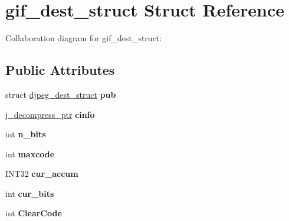 \hypertarget{structgif__dest__struct}{\section{gif\+\_\+dest\+\_\+struct Struct Reference}
\label{structgif__dest__struct}
}


Collaboration diagram for gif\+\_\+dest\+\_\+struct\+:
\subsection*{Public Attributes}
\begin{DoxyCompactItemize}
\item 
\hypertarget{structgif__dest__struct_a327fae4bb7216f81ba991b75424b9ff6}{struct \hyperlink{structdjpeg__dest__struct}{djpeg\+\_\+dest\+\_\+struct} {\bfseries pub}}\label{structgif__dest__struct_a327fae4bb7216f81ba991b75424b9ff6}

\item 
\hypertarget{structgif__dest__struct_a8b650480091b16e75d6e47a87872eb6f}{\hyperlink{structjpeg__decompress__struct}{j\+\_\+decompress\+\_\+ptr} {\bfseries cinfo}}\label{structgif__dest__struct_a8b650480091b16e75d6e47a87872eb6f}

\item 
\hypertarget{structgif__dest__struct_aab4e1121a99b5054c2d509e4720d1613}{int {\bfseries n\+\_\+bits}}\label{structgif__dest__struct_aab4e1121a99b5054c2d509e4720d1613}

\item 
\hypertarget{structgif__dest__struct_a603d791bdc9d1d690fa27764ae2a0cfa}{int {\bfseries maxcode}}\label{structgif__dest__struct_a603d791bdc9d1d690fa27764ae2a0cfa}

\item 
\hypertarget{structgif__dest__struct_aa3b997718f75a84bcbaaaa7413099cdb}{I\+N\+T32 {\bfseries cur\+\_\+accum}}\label{structgif__dest__struct_aa3b997718f75a84bcbaaaa7413099cdb}

\item 
\hypertarget{structgif__dest__struct_a63e54967fa60bf6e73ea45103169e5fc}{int {\bfseries cur\+\_\+bits}}\label{structgif__dest__struct_a63e54967fa60bf6e73ea45103169e5fc}

\item 
\hypertarget{structgif__dest__struct_a392ec168c7afe098f9b012c65adb87a9}{int {\bfseries Clear\+Code}}\label{structgif__dest__struct_a392ec168c7afe098f9b012c65adb87a9}


\end{DoxyCompactItemize}
